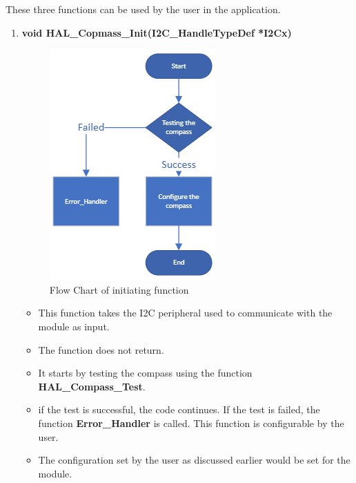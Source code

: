 These three functions can be used by the user in the application.
\begin{enumerate}
    \item \textbf{void HAL\_Copmass\_Init(I2C\_HandleTypeDef *I2Cx)}
    \begin{figure}[h]
        \centering
        \includegraphics[scale=.6]{figures/6.png}
        \caption{Flow Chart of initiating function}
    \end{figure}
    \begin{itemize}
        \item This function takes the I2C peripheral used to communicate with the module as input.
        \item The function does not return.
        \item It starts by testing the compass using the function \textbf{HAL\_Compass\_Test}.
        \item if the test is successful, the code continues. If the test is failed, the function \textbf{Error\_Handler} is called. This function is configurable by the user.
        \item The configuration set by the user as discussed earlier would be set for the module.
    \end{itemize}
    

\end{enumerate}
